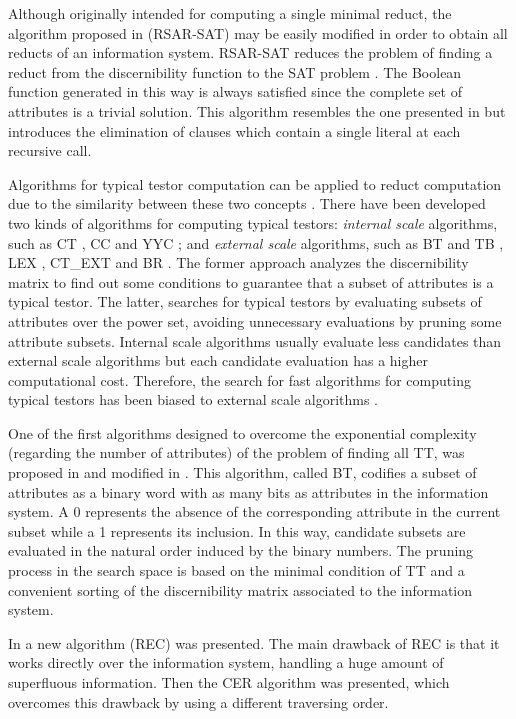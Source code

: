 \documentclass[number,preprint,review,12pt]{elsarticle}
\begin{document}
  Although originally intended for computing a single minimal reduct, the algorithm proposed in \citep{Jensen14} (RSAR-SAT) may be easily modified in order to obtain all reducts of an information system. RSAR-SAT reduces the problem of finding a reduct from the discernibility function to the SAT problem \citep{Davis62}. The Boolean function generated in this way is always satisfied since the complete set of attributes is a trivial solution. This algorithm resembles the one presented in \citep{Starzyk99} but introduces the elimination of clauses which contain a single literal at each recursive call. 

  Algorithms for typical testor computation can be applied to reduct computation due to the similarity between these two concepts \citep{Lazo15}. There have been developed two kinds of algorithms for computing typical testors: \emph{internal scale} algorithms, such as CT \citep{Bravo83}, CC \citep{Aguila84} and YYC \citep{Alba14}; and \emph{external scale} algorithms, such as BT and TB \citep{Ruiz85}, LEX \citep{Santiesteban03}, CT\_EXT \citep{Sanchez07} and BR \citep{Lias09}. The former approach analyzes the discernibility matrix to find out some conditions to guarantee that a subset of attributes is a typical testor. The latter, searches for typical testors by evaluating subsets of attributes over the power set, avoiding unnecessary evaluations by pruning some attribute subsets. Internal scale algorithms usually evaluate less candidates than external scale algorithms but each candidate evaluation has a higher computational cost. Therefore, the search for fast algorithms for computing typical testors has been biased to external scale algorithms \citep{Alba14}.
  
  One of the first algorithms designed to overcome the exponential complexity (regarding the number of attributes) of the problem of finding all TT, was proposed in \cite{Ruiz85} and modified in \cite{sanchez02}. This algorithm, called BT, codifies a subset of attributes as a binary word with as many bits as attributes in the information system. A 0 represents the absence of the corresponding attribute in the current subset while a 1 represents its inclusion. In this way, candidate subsets are evaluated in the natural order induced by the binary numbers. The pruning process in the search space is based on the minimal condition of TT and a convenient sorting of the discernibility matrix associated to the information system. 
  
  In \citep{Shulcloper95b} a new algorithm (REC) was presented. The main drawback of REC is that it works directly over the information system, handling a huge amount of superfluous information. Then the CER algorithm \cite{Ayaquica97} was presented, which overcomes this drawback by using a different traversing order.  
  
\end{document}

